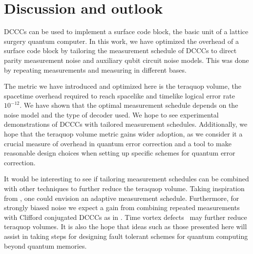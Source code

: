  \section{Discussion and outlook}
\label{sec:summary_and_outlook}

DCCCs can be used to implement a surface code block, the basic unit of a lattice surgery quantum computer.
In this work, we have optimized the overhead of a surface code block by tailoring the measurement schedule of DCCCs to direct parity measurement noise and auxiliary qubit circuit noise models.
This was done by repeating measurements and measuring in different bases.

The metric we have introduced and optimized here is the teraquop volume, the spacetime overhead required to reach spacelike and timelike logical error rate $10^{-12}$.
We have shown that the optimal measurement schedule depends on the noise model and the type of decoder used. 
We hope to see experimental demonstrations of DCCCs with tailored measurement schedules.
Additionally, we hope that the teraquop volume metric gains wider adoption, as we consider it a crucial measure of overhead in quantum error correction and a tool to make reasonable design choices when setting up specific schemes for quantum error correction.

It would be interesting to see if tailoring measurement schedules can be combined with other techniques to further reduce the teraquop volume.
Taking inspiration from , one could envision an adaptive measurement schedule.
Furthermore, for strongly biased noise we expect a gain from combining repeated measurements with Clifford conjugated DCCCs as in .
Time vortex defects~\cite{kishony2025increasingdistancetopologicalcodes} may further reduce teraquop volumes. It is also the hope that ideas such as those presented here will assist in taking steps for designing fault tolerant schemes for quantum computing beyond quantum memories.